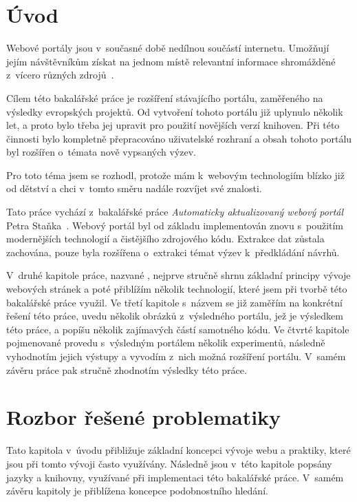 \chapter{Úvod}
Webové portály jsou v~současné době nedílnou součástí internetu. Umožňují jejím návštěvníkům získat na jednom místě relevantní informace shromážděné z~vícero různých zdrojů~\cite{bib:portal-liferay}.

Cílem této bakalářské práce je rozšíření stávajícího portálu, zaměřeného na výsledky evropských projektů. Od vytvoření tohoto portálu již uplynulo několik let, a proto bylo třeba jej upravit pro použití novějších verzí knihoven. Při této činnosti bylo kompletně přepracováno uživatelské rozhraní a obsah tohoto portálu byl rozšířen o~témata nově vypsaných výzev.

Pro toto téma jsem se rozhodl, protože mám k~webovým technologiím blízko již od dětství a chci v~tomto směru nadále rozvíjet své znalosti.

Tato práce vychází z~bakalářské práce \emph{Automaticky aktualizovaný webový portál} Petra Staňka~\cite{bib:stanek}.
Webový portál byl od základu implementován znovu s~použitím modernějších technologií a čistějšího zdrojového kódu. Extrakce dat zůstala zachována, pouze byla rozšířena o~extrakci témat výzev k~předkládání návrhů.

V~druhé kapitole práce, nazvané , nejprve stručně shrnu základní principy vývoje webových stránek a poté přiblížím několik technologií, které jsem při tvorbě této bakalářské práce využil.
Ve třetí kapitole s~názvem  se již zaměřím na konkrétní řešení této práce, uvedu několik obrázků z~výsledného portálu, jež je výsledkem této práce, a popíšu několik zajímavých částí samotného kódu.
Ve čtvrté kapitole pojmenované  provedu s~výsledným portálem několik experimentů, následně vyhodnotím jejich výstupy a vyvodím z~nich možná rozšíření portálu.
V~samém závěru práce pak stručně zhodnotím výsledky této práce.




\chapter{Rozbor řešené problematiky}
Tato kapitola v~úvodu přibližuje základní koncepci vývoje webu a praktiky, které jsou při tomto vývoji často využívány. Následně jsou v~této kapitole popsány jazyky a knihovny, využívané při implementaci této bakalářské práce. V~samém závěru kapitoly je přiblížena koncepce podobnostního hledání.




